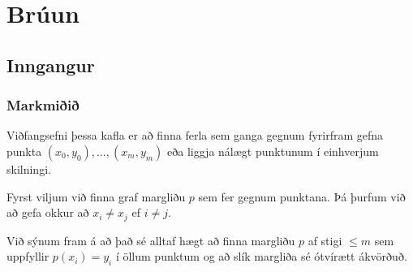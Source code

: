 \documentclass[icelandic,a4paper,12pt]{article}
\begin{document}
\section{Brúun}



\subsection{Inngangur}
\subsubsection{Markmiðið} 

Viðfangsefni þessa kafla er að finna ferla sem ganga gegnum fyrirfram
gefna punkta $(x_0,y_0),\dots,(x_m,y_m)$ eða liggja nálægt punktunum í
einhverjum skilningi.

\pause
\smallskip
Fyrst viljum við finna graf margliðu $p$ sem 
fer gegnum punktana.  Þá þurfum við að gefa okkur
að $x_i\neq x_j$ ef $i\neq j$.  

\pause
\smallskip
Við sýnum fram á 
að það sé alltaf hægt að finna margliðu $p$ af stigi $\leq m$ sem
uppfyllir  $p(x_i)=y_i$ í  öllum punktum
og að slík  margliða sé ótvírætt
ákvörðuð.
\end{document}
